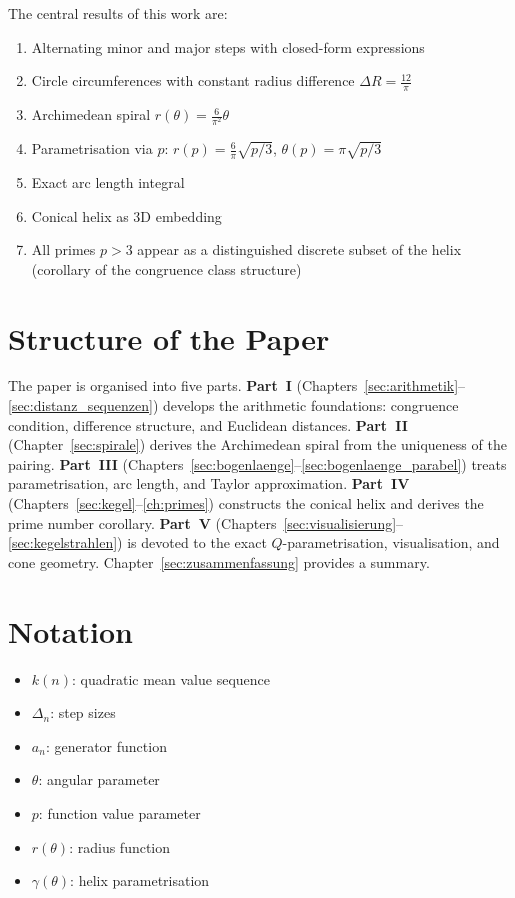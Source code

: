 The central results of this work are:
\begin{enumerate}
\item Alternating minor and major steps with closed-form expressions
\item Circle circumferences with constant radius difference $\Delta R = \frac{12}{\pi}$
\item Archimedean spiral $r(\theta) = \frac{6}{\pi^2}\theta$
\item Parametrisation via $p$: $r(p)=\frac{6}{\pi}\sqrt{p/3}$, $\theta(p)=\pi\sqrt{p/3}$
\item Exact arc length integral
\item Conical helix as 3D embedding
\item All primes $p>3$ appear as a distinguished discrete subset of the helix (corollary of the congruence class structure)
\end{enumerate}

\section*{Structure of the Paper}

The paper is organised into five parts. \textbf{Part~I}
(Chapters~\ref{sec:arithmetik}--\ref{sec:distanz_sequenzen}) develops the
arithmetic foundations: congruence condition, difference structure, and
Euclidean distances. \textbf{Part~II} (Chapter~\ref{sec:spirale}) derives
the Archimedean spiral from the uniqueness of the pairing.
\textbf{Part~III} (Chapters~\ref{sec:bogenlaenge}--\ref{sec:bogenlaenge_parabel})
treats parametrisation, arc length, and Taylor approximation.
\textbf{Part~IV} (Chapters~\ref{sec:kegel}--\ref{ch:primes}) constructs the
conical helix and derives the prime number corollary. \textbf{Part~V}
(Chapters~\ref{sec:visualisierung}--\ref{sec:kegelstrahlen}) is devoted to the
exact $Q$-parametrisation, visualisation, and cone geometry.
Chapter~\ref{sec:zusammenfassung} provides a summary.

\section*{Notation}

\begin{itemize}[leftmargin=2em]
\item $k(n)$: quadratic mean value sequence
\item $\Delta_n$: step sizes
\item $a_n$: generator function
\item $\theta$: angular parameter
\item $p$: function value parameter
\item $r(\theta)$: radius function
\item $\gamma(\theta)$: helix parametrisation
\end{itemize}
